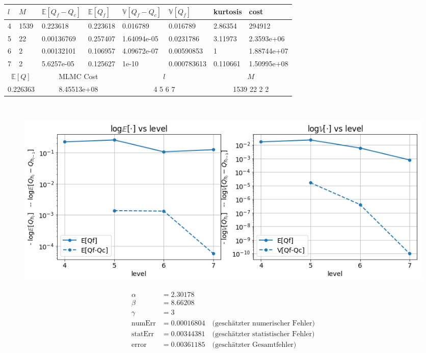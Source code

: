\noindent\begin{tabular}{|p{0.15\q}|p{0.55\q}|p{1.4\q}|p{1.05\q}|p{1.35\q}|p{1.25\q}|p{0.9\q}|p{1.35\q}|}
	\hline
	$ l $   &  $ M $  &  $ \mathbb{E}[Q_f-Q_c] $  &   $ \mathbb{E}[Q_f] $ &  $ \mathbb{V}[Q_f-Q_c] $   &   $ \mathbb{V}[Q_f] $ &  kurtosis    &    cost\\
	\hline
	4 & 1539 &   0.223618  &  0.223618&    0.016789&    0.016789 &    2.86354&      294912  \\
	5  &  22 & 0.00136769  &  0.257407& 1.64094e-05&   0.0231786 &    3.11973&  2.3593e+06 \\
	6   &  2 & 0.00132101  &  0.106957& 4.09672e-07&  0.00590853 &          1& 1.88744e+07 \\
	7    & 2 & 5.6257e-05  &  0.125627&       1e-10& 0.000783613 &   0.110661& 1.50995e+08 \\
	\hline
	\multicolumn{2}{|c|}{$ \mathbb{E}[Q] $ }  &  \multicolumn{2}{c|}{MLMC Cost}   & \multicolumn{2}{c|}{$ l $}  &    \multicolumn{2}{c|}{$ M$} \\
	\hline
	\multicolumn{2}{|c|}{0.226363} & \multicolumn{2}{c|}{8.45513e+08  } &  \multicolumn{2}{c|}{  4 5 6 7 }     & \multicolumn{2}{c|}{1539 22 2 2}    \\
	\hline 
\end{tabular}\\
\begin{figure}[H]
	\centering
	\includegraphics[width=\textwidth]{plots/eps005.png} 
\end{figure}
\begin{align*}
\alpha  &=     2.30178   \\
\beta   &=    8.66208   \\
\gamma  &=    3   \\
\text{numErr}  &=  0.00016804   \quad \text{(geschätzter numerischer Fehler)}\\
\text{statErr} &= 0.00344381  \quad  \text{(geschätzter statistischer Fehler)}\\
\text{error}   &= 0.00361185  \quad  \text{(geschätzter Gesamtfehler)}\\
\end{align*}


